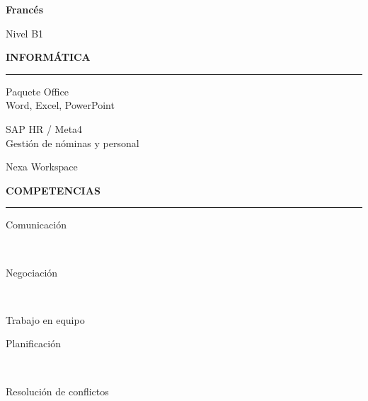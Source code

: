 \documentclass[10pt,a4paper]{article}
\newcommand{\sidesection}[1]{%
  \vspace{4pt}
  {\color{primary}\large\bfseries\MakeUppercase{#1}}\par
  \vspace{-5pt}
  {\color{primary}\rule{\linewidth}{0.7pt}}\par
  \vspace{5pt}
}
\newcommand{\jobtitle}[2]{%
  \textbf{\color{ink}#1}\hfill{\small\color{muted}#2}\par
}
\newcommand{\levelbar}[1]{%
  \ifcase#1\relax
  \or\textcolor{primary}{\faCircle}\textcolor{primary!15}{\faCircle\faCircle\faCircle\faCircle}%
  \or\textcolor{primary}{\faCircle\faCircle}\textcolor{primary!15}{\faCircle\faCircle\faCircle}%
  \or\textcolor{primary}{\faCircle\faCircle\faCircle}\textcolor{primary!15}{\faCircle\faCircle}%
  \or\textcolor{primary}{\faCircle\faCircle\faCircle\faCircle}\textcolor{primary!15}{\faCircle}%
  \or\textcolor{primary}{\faCircle\faCircle\faCircle\faCircle\faCircle}%
  \fi
}
\newcommand{\pill}[1]{%
  \colorbox{sand}{\strut\textcolor{primary}{\small #1}}%
}
\begin{document}
\begin{minipage}[t]{0.335\textwidth}
\vspace{6pt}
\jobtitle{Franc\'es}{}
{\footnotesize\color{muted}Nivel B1}\\[2pt]
\levelbar{3}

\sidesection{Inform\'atica}

Paquete Office\\
{\footnotesize\color{muted}Word, Excel, PowerPoint}\\[2pt]
\levelbar{5}

\vspace{6pt}
SAP HR / Meta4\\
{\footnotesize\color{muted}Gesti\'on de n\'ominas y personal}\\[2pt]
\levelbar{3}

\vspace{6pt}
Nexa Workspace\\[2pt]
\levelbar{4}

\sidesection{Competencias}

\pill{Comunicaci\'on}\ \pill{Negociaci\'on}\ \pill{Trabajo en equipo}

\vspace{5pt}

\pill{Planificaci\'on}\ \pill{Resoluci\'on de conflictos}

\end{minipage}%
\hspace{0.03\textwidth}%
\end{document}
